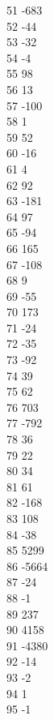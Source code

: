 { 51	-683 \\
 52	-44 \\
 53	-32 \\
 54	-4 \\
 55	98 \\
 56	13 \\
 57	-100 \\
 58	1 \\
 59	52 \\
 60	-16 \\
 61	4 \\
 62	92 \\
 63	-181 \\
 64	97 \\
 65	-94 \\
 66	165 \\
 67	-108 \\
 68	9 \\
 69	-55 \\
 70	173 \\
 71	-24 \\
 72	-35 \\
 73	-92 \\
 74	39 \\
 75	62 \\
 76	703 \\
 77	-792 \\
 78	36 \\
 79	22 \\
 80	34 \\
 81	61 \\
 82	-168 \\
 83	108 \\
 84	-38 \\
 85	5299 \\
 86	-5664 \\
 87	-24 \\
 88	-1 \\
 89	237 \\
 90	4158 \\
 91	-4380 \\
 92	-14 \\
 93	-2 \\
 94	1 \\
 95	-1 \\
}
